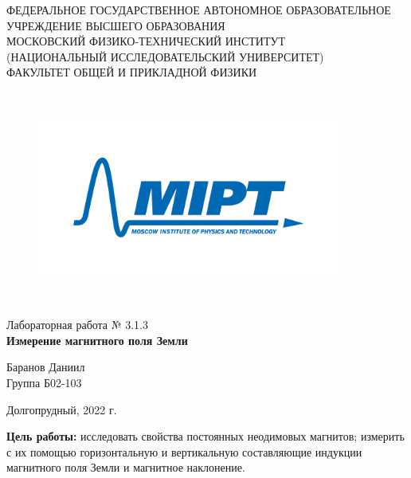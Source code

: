 \documentclass[a4paper,12pt]{article} %
\begin{document}
\begin{center}
	\footnotesize{ФЕДЕРАЛЬНОЕ ГОСУДАРСТВЕННОЕ АВТОНОМНОЕ ОБРАЗОВАТЕЛЬНОЕ 			УЧРЕЖДЕНИЕ ВЫСШЕГО ОБРАЗОВАНИЯ}\\
	\footnotesize{МОСКОВСКИЙ ФИЗИКО-ТЕХНИЧЕСКИЙ ИНСТИТУТ\\(НАЦИОНАЛЬНЫЙ 			ИССЛЕДОВАТЕЛЬСКИЙ УНИВЕРСИТЕТ)}\\
	\footnotesize{ФАКУЛЬТЕТ ОБЩЕЙ И ПРИКЛАДНОЙ ФИЗИКИ\\}
	\hfill \break
	\hfill \break
	\hfill \break
	\hfill \break
\end{center}


\begin{figure}[h]
    \centering
    \includegraphics*[width=10cm,height=7cm,keepaspectratio]{mipt_eng_text_png.png}
    \label{fig:my_label}
\end{figure}


\begin{center}   
    \hfill \break
	\hfill \break
	\hfill \break
	\large{Лабораторная работа № 3.1.3\\\large{\textbf{Измерение магнитного поля Земли}}}\\
	\hfill \break
	\hfill \break
	\hfill \break
	\hfill \break
	\begin{flushright}
		Баранов Даниил\\
		Группа Б02-103
	\end{flushright}
	\hfill \break
	\hfill \break
	\hfill \break
\end{center}
\hfill \break
\hfill \break
\hfill \break
\hfill \break
\begin{center}
	Долгопрудный, 2022 г.
\end{center}
\thispagestyle{empty}

\newpage

\textbf{Цель работы:} исследовать свойства постоянных неодимовых магнитов; измерить с их помощью горизонтальную и вертикальную составляющие индукции магнитного поля Земли и магнитное наклонение.
\end{document}
